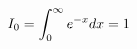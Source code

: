 \documentclass[preview]{standalone}
\begin{document}
\begin{align*}
\special{dvisvgm:raw <g id='unique000'>}I_0=\displaystyle\int_0^{\infty}e^{-x}dx=1\special{dvisvgm:raw </g>}
\end{align*}
\end{document}
